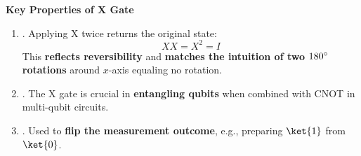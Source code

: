 \highspace
\begin{flushleft}
   \textcolor{Green3}{ \textbf{Key Properties of X Gate}}
\end{flushleft}
\begin{enumerate}
   \item {}. Applying X twice returns the original state:
   \begin{equation*}
      X X = X^{2} = I
   \end{equation*}
   This \textbf{reflects reversibility} and \textbf{matches the intuition of two $180\degree$ rotations} around $x$-axis equaling no rotation.

   \item {}. The X gate is crucial in \textbf{entangling qubits} when combined with CNOT in multi-qubit circuits.
   \item {}. Used to \textbf{flip the measurement outcome}, e.g., preparing $\ket{1}$ from $\ket{0}$.
\end{enumerate}